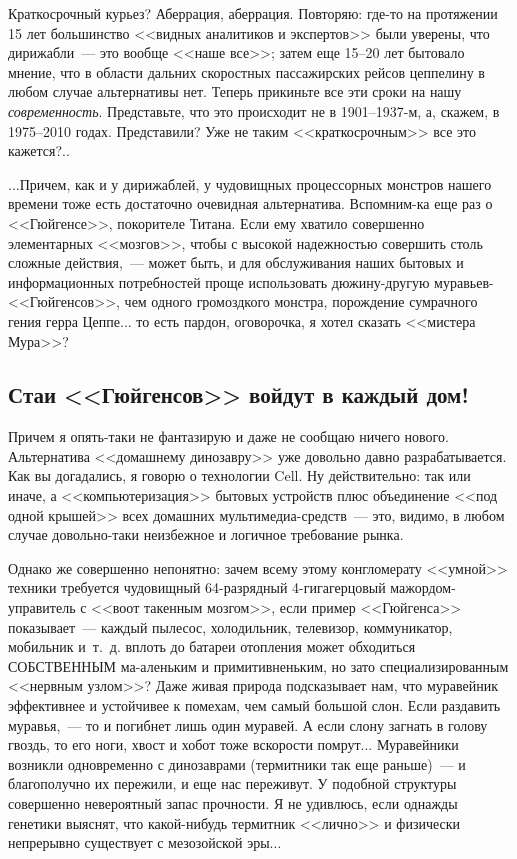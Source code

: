 \documentclass{scrbook}
\newcommand{\flqq}{<<}
\newcommand{\frqq}{>>}
\newcommand{\mdash}{~--- }
\newcommand{\ndash}{--}
\newcommand{\commamdash}{~--- } %
\newcommand{\essaysection}[1]{\subsection*{#1}\nopagebreak}
\begin{document}
Краткосрочный курьез? Аберрация, аберрация. Повторяю: где-то на протяжении 15 лет большинство {\flqq}видных аналитиков и экспертов{\frqq} были уверены, что дирижабли{\mdash}это вообще {\flqq}наше все{\frqq}; затем еще 15{\ndash}20 лет бытовало мнение, что в области дальних скоростных пассажирских рейсов цеппелину в любом случае альтернативы нет. Теперь прикиньте все эти сроки на нашу \emph{современность}. Представьте, что это происходит не в 1901{\ndash}1937-м, а, скажем, в 1975{\ndash}2010 годах. Представили? Уже не таким {\flqq}краткосрочным{\frqq} все это кажется?..

...Причем, как и у дирижаблей, у чудовищных процессорных монстров нашего времени тоже есть достаточно очевидная альтернатива. Вспомним-ка еще раз о {\flqq}Гюйгенсе{\frqq}, покорителе Титана. Если ему хватило совершенно элементарных {\flqq}мозгов{\frqq}, чтобы с высокой надежностью совершить столь сложные действия,{\commamdash}может быть, и для обслуживания наших бытовых и информационных потребностей проще использовать дюжину-другую муравьев-{\flqq}Гюйгенсов{\frqq}, чем одного громоздкого монстра, порождение сумрачного гения герра Цеппе... то есть пардон, оговорочка, я хотел сказать {\flqq}мистера Мура{\frqq}?

\essaysection{Стаи {\flqq}Гюйгенсов{\frqq} войдут в каждый дом!}

Причем я опять-таки не фантазирую и даже не сообщаю ничего нового. Альтернатива {\flqq}домашнему динозавру{\frqq} уже довольно давно разрабатывается. Как вы догадались, я говорю о технологии Cell. Ну действительно: так или иначе, а {\flqq}компьютеризация{\frqq} бытовых устройств плюс объединение {\flqq}под одной крышей{\frqq} всех домашних мультимедиа-средств{\mdash}это, видимо, в любом случае довольно-таки неизбежное и логичное требование рынка.

Однако же совершенно непонятно: зачем всему этому конгломерату {\flqq}умной{\frqq} техники требуется чудовищный 64-разрядный 4-гигагерцовый мажордом-управитель с {\flqq}воот такенным мозгом{\frqq}, если пример {\flqq}Гюйгенса{\frqq} показывает{\mdash}каждый пылесос, холодильник, телевизор, коммуникатор, мобильник и~т.~д. вплоть до батареи отопления может обходиться СОБСТВЕННЫМ ма-аленьким и примитивненьким, но зато специализированным {\flqq}нервным узлом{\frqq}? Даже живая природа подсказывает нам, что муравейник эффективнее и устойчивее к помехам, чем самый большой слон. Если раздавить муравья,{\commamdash}то и погибнет лишь один муравей. А если слону загнать в голову гвоздь, то его ноги, хвост и хобот тоже вскорости помрут... Муравейники возникли одновременно с динозаврами (термитники так еще раньше){\mdash}и благополучно их пережили, и еще нас переживут. У подобной структуры совершенно невероятный запас прочности. Я не удивлюсь, если однажды генетики выяснят, что какой-нибудь термитник {\flqq}лично{\frqq} и физически непрерывно существует с мезозойской эры...
\end{document}
